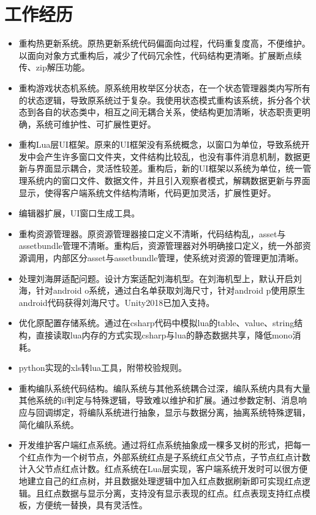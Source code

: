 \documentclass{resume}
\begin{document}
\section{工作经历}
\begin{itemize}
  \item 重构热更新系统。原热更新系统代码偏面向过程，代码重复度高，不便维护。以面向对象方式重构后，减少了代码冗余性，代码结构更清晰。扩展断点续传、zip解压功能。
  \item 重构游戏状态机系统。原系统用枚举区分状态，在一个状态管理器类内写所有的状态逻辑，导致原系统过于复杂。我使用状态模式重构该系统，拆分各个状态到各自的状态类中，相互之间无耦合关系，使结构更加清晰，状态职责更明确，系统可维护性、可扩展性更好。
  \item 重构Lua层UI框架。原来的UI框架没有系统概念，以窗口为单位，导致系统开发中会产生许多窗口文件夹，文件结构比较乱，也没有事件消息机制，数据更新与界面显示耦合，灵活性较差。重构后，新的UI框架以系统为单位，统一管理系统内的窗口文件、数据文件，并且引入观察者模式，解耦数据更新与界面显示，使得客户端系统文件结构清晰，代码更加灵活，扩展性更好。
  \item 编辑器扩展，UI窗口生成工具。
  \item 重构资源管理器。原资源管理器接口定义不清晰，代码结构乱，asset与assetbundle管理不清晰。重构后，资源管理器对外明确接口定义，统一外部资源调用，内部区分asset与assetbundle管理，使系统对资源的管理更加清晰。
  \item 处理刘海屏适配问题。设计方案适配刘海机型。在刘海机型上，默认开启刘海，针对android o系统，通过白名单获取刘海尺寸，针对android p使用原生android代码获得刘海尺寸。Unity2018已加入支持。
  \item 优化原配置存储系统。通过在csharp代码中模拟lua的table、value、string结构，直接读取lua内存的方式实现csharp与lua的静态数据共享，降低mono消耗。
  \item python实现的xls转lua工具，附带校验规则。
  \item 重构编队系统代码结构。编队系统与其他系统耦合过深，编队系统内具有大量其他系统的if判定与特殊逻辑，导致难以维护和扩展。通过参数定制、消息响应与回调绑定，将编队系统进行抽象，显示与数据分离，抽离系统特殊逻辑，简化编队系统。
  \item 开发维护客户端红点系统。通过将红点系统抽象成一棵多叉树的形式，把每一个红点作为一个树节点，外部系统红点是子系统红点父节点，子节点红点计数计入父节点红点计数。红点系统在Lua层实现，客户端系统开发时可以很方便地建立自己的红点树，并且数据处理逻辑中加入红点数据刷新即可实现红点逻辑。且红点数据与显示分离，支持没有显示表现的红点。红点表现支持红点模板，方便统一替换，具有灵活性。

\end{itemize}
\end{document}

